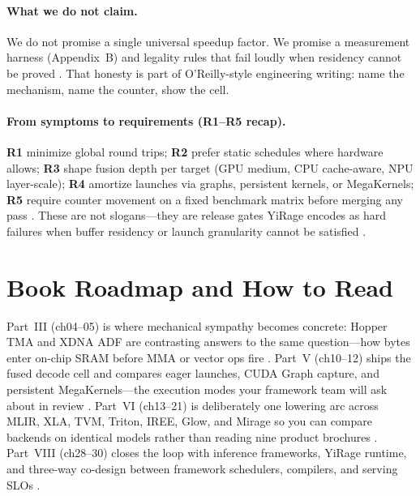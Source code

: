 \paragraph{What we do not claim.}
We do not promise a single universal speedup factor.
We promise a measurement harness (Appendix~B) and legality rules that fail loudly when residency cannot be proved \citep{yirage2026,arya2024apreliminaryperfor}.
That honesty is part of O'Reilly-style engineering writing: name the mechanism, name the counter, show the cell.


\paragraph{From symptoms to requirements (R1--R5 recap).}
\textbf{R1} minimize global round trips;
\textbf{R2} prefer static schedules where hardware allows;
\textbf{R3} shape fusion depth per target (GPU medium, CPU cache-aware, NPU layer-scale);
\textbf{R4} amortize launches via graphs, persistent kernels, or MegaKernels;
\textbf{R5} require counter movement on a fixed benchmark matrix before merging any pass \citep{yirage2026,chen2020compilerbasedhardw}.
These are not slogans---they are release gates YiRage encodes as hard failures when buffer residency or launch granularity cannot be satisfied \citep{yirage2026}.

\section{Book Roadmap and How to Read}
\label{sec:book_roadmap}

Part~III (ch04--05) is where mechanical sympathy becomes concrete: Hopper TMA and XDNA ADF are contrasting answers to the same question---how bytes enter on-chip SRAM before MMA or vector ops fire \citep{semianalysis2024tma,amd2024xdna}.
Part~V (ch10--12) ships the fused decode cell and compares eager launches, CUDA Graph capture, and persistent MegaKernels---the execution modes your framework team will ask about in review \citep{nvidia2024cudagraphs,yirage2026}.
Part~VI (ch13--21) is deliberately one lowering arc across MLIR, XLA, TVM, Triton, IREE, Glow, and Mirage so you can compare backends on identical models rather than reading nine product brochures \citep{chen2020compilerbasedhardw}.
Part~VIII (ch28--30) closes the loop with inference frameworks, YiRage runtime, and three-way co-design between framework schedulers, compilers, and serving SLOs \citep{kwon2023vllm,yirage2026}.


